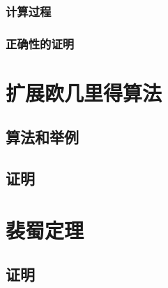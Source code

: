 \documentclass[UTF8]{ctexart}
\begin{document}
\subsubsection*{计算过程}
\subsubsection*{正确性的证明}
\section*{扩展欧几里得算法}
\subsection*{算法和举例}
\subsection*{证明}
\section*{裴蜀定理}
\subsection*{证明}
\end{document}
